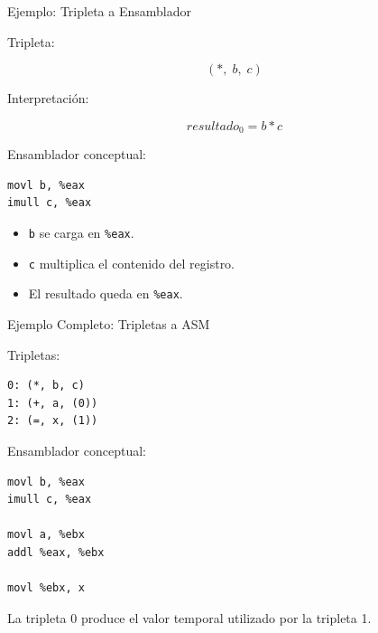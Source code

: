 \documentclass{beamer}
\begin{document}
\begin{frame}[fragile]{Ejemplo: Tripleta a Ensamblador}

Tripleta:

\[
(*,\; b,\; c)
\]

\vspace{0.3cm}

Interpretación:

\[
resultado_0 = b * c
\]

\vspace{0.3cm}

Ensamblador conceptual:

\begin{lstlisting}
movl b, %eax
imull c, %eax
\end{lstlisting}

\vspace{0.3cm}

\begin{itemize}
    \item \texttt{b} se carga en \texttt{\%eax}.
    \item \texttt{c} multiplica el contenido del registro.
    \item El resultado queda en \texttt{\%eax}.
\end{itemize}

\end{frame}

\begin{frame}[fragile]{Ejemplo Completo: Tripletas a ASM}

Tripletas:

\begin{lstlisting}
0: (*, b, c)
1: (+, a, (0))
2: (=, x, (1))
\end{lstlisting}

\vspace{0.3cm}

Ensamblador conceptual:

\begin{lstlisting}
movl b, %eax
imull c, %eax

movl a, %ebx
addl %eax, %ebx

movl %ebx, x
\end{lstlisting}

\vspace{0.3cm}

La tripleta 0 produce el valor temporal utilizado por la tripleta 1.

\end{frame}
\end{document}
